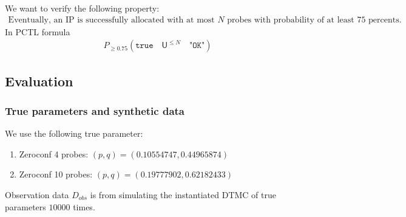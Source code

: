 We want to verify the following property:
\begin{align*}
    \text{Eventually, an IP is successfully allocated with at most $N$ probes with probability of at least 75 percents.}
\end{align*}
In PCTL formula
\begin{align*}
    P_{\geq 0.75} ( \texttt{true} \quad \mathsf{U}^{\leq N} \quad \texttt{"OK"} )
\end{align*}

\subsection{Evaluation}
\subsubsection{True parameters and synthetic data}
We use the following true parameter:
\begin{enumerate}
    \item Zeroconf 4 probes: $(p,q)=(0.10554747, 0.44965874)$
    \item Zeroconf 10 probes: $(p,q)=(0.19777902, 0.62182433)$
\end{enumerate}
Observation data $D_{obs}$ is from simulating the instantiated DTMC of true parameters $10000$ times.
